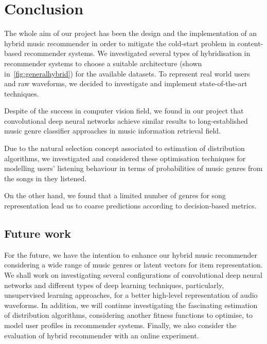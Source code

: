\chapter{Conclusion}
\label{ch:conclusion}
The whole aim of our project has been the design and the implementation of an hybrid music recommender in order to mitigate the cold-start problem in content-based recommender systems. We investigated several types of hybridisation in recommender systems to choose a suitable architecture (shown in~\ref{fig:generalhybrid}) for the available datasets. To represent real world users and raw waveforms, we decided to investigate and implement state-of-the-art techniques.

Despite of the success in computer vision field, we found in our project that convolutional deep neural networks achieve similar results to long-established music genre classifier approaches in music information retrieval field.

Due to the natural selection concept associated to estimation of distribution algorithms, we investigated and considered these optimisation techniques for modelling users' listening behaviour in terms of probabilities of music genres from the songs in they listened.

On the other hand, we found that a limited number of genres for song representation lead us to coarse predictions according to decision-based metrics.

\section{Future work}

For the future, we have the intention to enhance our hybrid music recommender considering a wide range of music genres or latent vectors for item representation. We shall work on investigating several configurations of convolutional deep neural networks and different types of deep learning techniques, particularly, unsupervised learning approaches, for a better high-level representation of audio waveforms. In addition, we will continue investigating the fascinating estimation of distribution algorithms, considering another fitness functions to optimise, to model user profiles in recommender systems. Finally, we also consider the evaluation of hybrid recommender with an online experiment.